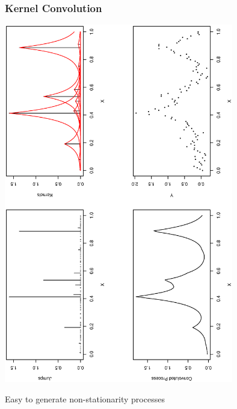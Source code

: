\documentclass[]{beamer}
\newcommand{\bs}[2]{\begin{frame} \frametitle{#1}
{#2}
\end{frame} }
\begin{document}
\bs{Kernel Convolution } {
    \includegraphics[angle=270,origin=l,totalheight=6truecm,
     clip=1, width=10cm]{gammaproc2.ps}

Easy to generate  non-stationarity processes

}
\end{document}
